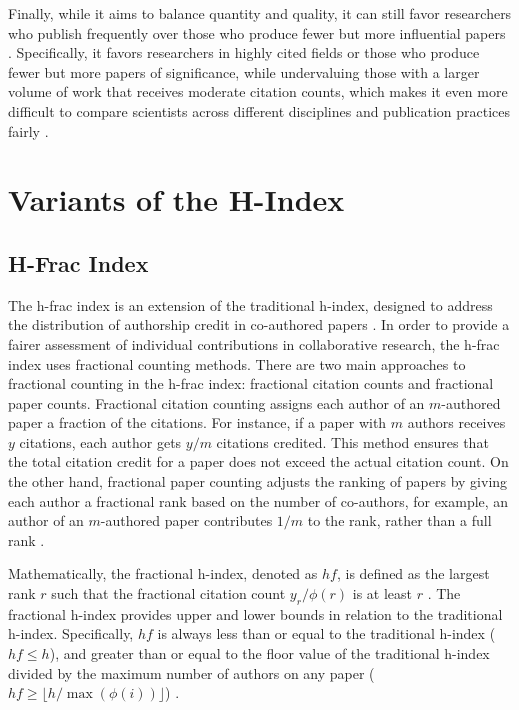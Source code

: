 Finally, while it aims to balance quantity and quality, it can still favor
researchers who publish frequently over those who produce fewer but more
influential papers
\cite{hirsch2005index,costas2007h,waltman2012inconsistency,norris2010h,egghe2010hirsch,hirsch2014meaning}.
Specifically, it favors researchers in highly cited fields or those who produce
fewer but more papers of significance, while undervaluing those with a larger
volume of work that receives moderate citation counts, which makes it even more
difficult to compare scientists across different disciplines and publication
practices fairly
\cite{hirsch2005index,costas2007h,waltman2012inconsistency,egghe2010hirsch}.

\section{Variants of the H-Index}
\subsection{H-Frac Index}
The h-frac index is an extension of the traditional h-index, designed to
address the distribution of authorship credit in co-authored papers
\cite{egghe2008mathematical}. In order to provide a fairer assessment of
individual contributions in collaborative research, the h-frac index uses
fractional counting methods. There are two main approaches to fractional
counting in the h-frac index: fractional citation counts and fractional paper
counts. Fractional citation counting assigns each author of an $m$-authored
paper a fraction of the citations. For instance, if a paper with $m$ authors
receives $y$ citations, each author gets $y/m$ citations credited. This method
ensures that the total citation credit for a paper does not exceed the actual
citation count. On the other hand, fractional paper counting adjusts the
ranking of papers by giving each author a fractional rank based on the number
of co-authors, for example, an author of an $m$-authored paper contributes
$1/m$ to the rank, rather than a full rank
\cite{egghe2008mathematical,bihari2018h}.

Mathematically, the fractional h-index, denoted as $hf$, is defined as the
largest rank $r$ such that the fractional citation count $y_r/\phi(r)$ is at
least $r$ \cite{egghe2008mathematical}. The fractional h-index provides upper
and lower bounds in relation to the traditional h-index. Specifically, $hf$ is
always less than or equal to the traditional h-index ($hf \leq h$), and greater
than or equal to the floor value of the traditional h-index divided by the
maximum number of authors on any paper ($hf \geq \lfloor h / \max(\phi(i))
    \rfloor$) \cite{egghe2008mathematical}.

